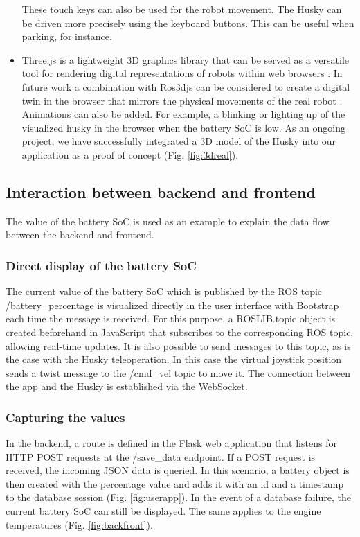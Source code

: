 \documentclass[conference]{IEEEtran}
\begin{document}
\begin{itemize}
These touch keys can also be used for the robot movement. The Husky can be driven more precisely using the keyboard buttons. This can be useful when parking, for instance.
\item Three.js is a lightweight 3D graphics library that can be served as a versatile tool for rendering digital representations of robots within web browsers \cite{threejs}. In future work a combination with Ros3djs can be considered to create a digital twin in the browser that mirrors the physical movements of the real robot \cite{ros3djs}. Animations can also be added. For example, a blinking or lighting up of the visualized husky in the browser when the battery SoC is low. 
As an ongoing project, we have successfully integrated a 3D model of the Husky into our application as a proof of concept (Fig. \ref{fig:3dreal}).
\end{itemize}

\subsection{Interaction between backend and frontend}
The value of the battery SoC is used as an example to explain the data flow between the backend and frontend. 
\subsubsection{Direct display of the battery SoC}
The current value of the battery SoC which is published by the ROS topic /battery\_percentage is visualized directly in the user interface with Bootstrap each time the message is received. For this purpose, a ROSLIB.topic object is created beforehand in JavaScript that subscribes to the corresponding ROS topic, allowing real-time updates. It is also possible to send messages to this topic, as is the case with the Husky teleoperation. 
In this case the virtual joystick position sends a twist message to the /cmd\_vel topic to move it. 
The connection between the app and the Husky is established via the WebSocket. 
\subsubsection{Capturing the values}
In the backend, a route is defined in the Flask web application that listens for HTTP POST requests at the /save\_data endpoint. If a POST request is received, the incoming JSON data is queried. In this scenario, a battery object is then created with the percentage value and adds it with an id and a timestamp to the database session (Fig. \ref{fig:userapp}). In the event of a database failure, the current battery SoC can still be displayed. The same applies to the engine temperatures (Fig. \ref{fig:backfront}).
\end{document}
